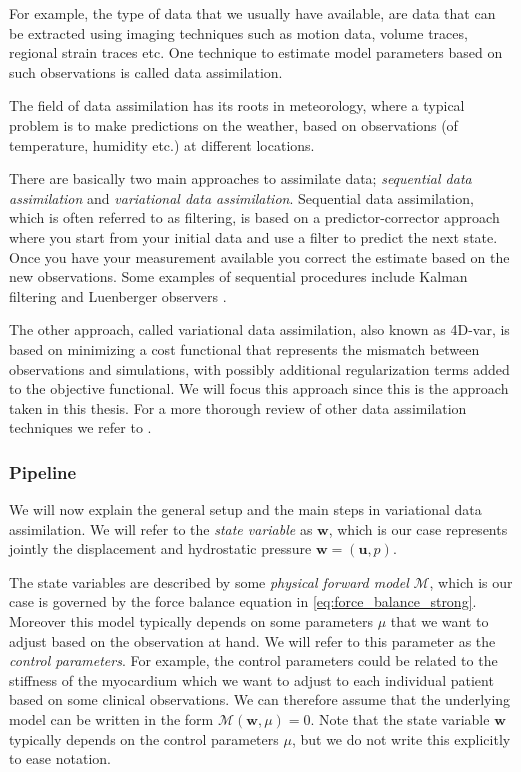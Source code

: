 For example, the type of data that we usually have available, are data
that can be extracted using imaging techniques such as motion data,
volume traces, regional strain traces etc. One technique to estimate
model parameters based on such observations is called data assimilation.


The field of data assimilation has its roots in meteorology, where
a typical problem is to make predictions on the weather, based on
observations (of temperature, humidity etc.) at different locations. 


There are basically two main approaches to assimilate data;
\emph{sequential data assimilation} and \emph{variational data
  assimilation}. Sequential data assimilation, which is often
referred to as filtering, is based on a predictor-corrector approach
where you start from your initial data and use a filter to predict the
next state. Once you have your measurement available you correct the
estimate based on the new observations. Some examples of sequential
procedures include Kalman filtering and Luenberger observers
\cite{chapelle2013fundamental}.

The other approach, called variational data assimilation, also known as
4D-var, is based on minimizing a cost functional that
represents the mismatch between observations and simulations, with
possibly additional regularization terms added to the objective
functional. We will focus this approach since this is the approach
taken in this thesis. For a more thorough review of other
data assimilation techniques we refer to \cite{chapelle2013fundamental}.


\subsubsection{Pipeline}
\label{sec:data_assimilation_pipeline}

We will now explain the general setup and the main steps in variational data
assimilation. We will refer to
the \emph{state variable} as $\mathbf{w}$, which is our case
represents jointly the displacement and hydrostatic pressure
$\mathbf{w}=(\mathbf{u}, p)$.

The state variables are described by some \emph{physical forward
model} $\mathcal{M}$, which is our case is governed by the force balance
equation in \eqref{eq:force_balance_strong}. Moreover this model
typically depends on some parameters $\mu$ that we want to
adjust based on the observation at hand. We will refer to this
parameter as the \emph{control parameters}. For example, the control
parameters could be related to the stiffness of the myocardium which
we want to adjust to each individual patient based on some
clinical observations. We can therefore assume that the underlying
model can be written in the form $\mathcal{M}(\mathbf{w}, \mu) =
0$. Note that the state variable $\mathbf{w}$ typically depends on the
control parameters $\mu$, but we do not write this explicitly to
ease notation.

